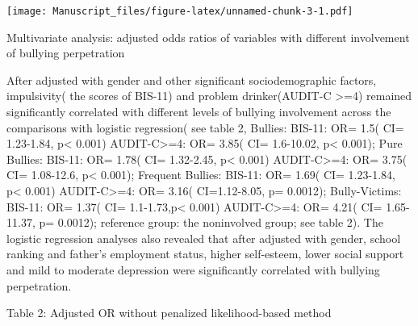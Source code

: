 \documentclass[
]{article}
\newenvironment{Shaded}{\begin{snugshade}}{\end{snugshade}}
\newcommand{\DataTypeTok}[1]{\textcolor[rgb]{0.13,0.29,0.53}{#1}}
\newcommand{\DecValTok}[1]{\textcolor[rgb]{0.00,0.00,0.81}{#1}}
\newcommand{\KeywordTok}[1]{\textcolor[rgb]{0.13,0.29,0.53}{\textbf{#1}}}
\newcommand{\NormalTok}[1]{#1}
\newcommand{\OperatorTok}[1]{\textcolor[rgb]{0.81,0.36,0.00}{\textbf{#1}}}
\begin{document}
\texttt{[image: Manuscript\_files/figure-latex/unnamed-chunk-3-1.pdf]}

Multivariate analysis: adjusted odds ratios of variables with different
involvement of bullying perpetration

After adjusted with gender and other significant sociodemographic
factors, impulsivity( the scores of BIS-11) and problem drinker(AUDIT-C
\textgreater=4) remained significantly correlated with different levels
of bullying involvement across the comparisons with logistic regression(
see table 2, Bullies: BIS-11: OR= 1.5( CI= 1.23-1.84, p\textless{}
0.001) AUDIT-C\textgreater=4: OR= 3.85( CI= 1.6-10.02, p\textless{}
0.001); Pure Bullies: BIS-11: OR= 1.78( CI= 1.32-2.45, p\textless{}
0.001) AUDIT-C\textgreater=4: OR= 3.75( CI= 1.08-12.6, p\textless{}
0.001); Frequent Bullies: BIS-11: OR= 1.69( CI= 1.23-1.84, p\textless{}
0.001) AUDIT-C\textgreater=4: OR= 3.16( CI=1.12-8.05, p= 0.0012);
Bully-Victims: BIS-11: OR= 1.37( CI= 1.1-1.73,p\textless{} 0.001)
AUDIT-C\textgreater=4: OR= 4.21( CI= 1.65-11.37, p= 0.0012); reference
group: the noninvolved group; see table 2). The logistic regression
analyses also revealed that after adjusted with gender, school ranking
and father's employment status, higher self-esteem, lower social support
and mild to moderate depression were significantly correlated with
bullying perpetration.

Table 2: Adjusted OR without penalized likelihood-based method

\begin{Shaded}
\end{Shaded}
\end{document}
